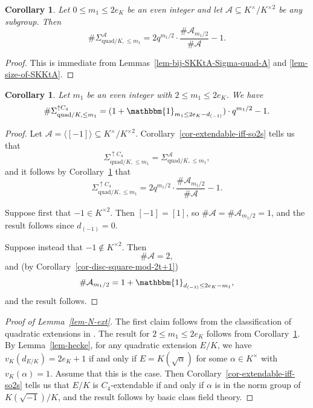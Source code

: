 \documentclass[11pt]{amsart}
\theoremstyle{theorem}
\newtheorem{corollary}[theorem]{Corollary}
\theoremstyle{example}
\theoremstyle{definition}
\numberwithin{theorem}{section}
\numberwithin{theorem}{section}
\newcommand{\quadr}{\mathrm{quad}}
\newcommand{\extendable}{\uparrow C_4}
\begin{document}
\begin{corollary}
    \label{cor-size-of-Sigma-quad-A-leq-m1}
    Let $0 \leq m_1 \leq 2e_K$ be an even integer and let $\mathcal{A}\subseteq K^\times / K^{\times 2}$ be any subgroup. Then
    $$
    \# \Sigma_{\quadr/K,\leq m_1}^{\mathcal{A}} = 2q^{m_1/2} \cdot \frac{\#\mathcal{A}_{m_1/2}}{\#\mathcal{A}} - 1. 
    $$
\end{corollary}
\begin{proof}
    This is immediate from Lemmas~\ref{lem-bij-SKKtA-Sigma-quad-A} and \ref{lem-size-of-SKKtA}. 
\end{proof}
\begin{corollary}
    \label{cor-num-extendables-with-even-disc}
    Let $m_1$ be an even integer with $2 \leq m_1 \leq 2e_K$. We have  
    $$
    \#\Sigma_{\quadr/K,\leq m_1}^{\extendable} =(1 + \mathbbm{1}_{m_1 \leq 2e_K - d_{(-1)}})\cdot q^{m_1/2} - 1. 
    $$
\end{corollary}
\begin{proof}
    Let $\mathcal{A} = \langle [-1] \rangle \subseteq K^\times / K^{\times 2}$. Corollary~\ref{cor-extendable-iff-so2s} tells us that
    $$
    \Sigma_{\quadr/K,\leq m_1}^{\extendable} = \Sigma_{\quadr/K,\leq m_1}^{\mathcal{A}}, 
    $$
    and it follows by Corollary~\ref{cor-size-of-Sigma-quad-A-leq-m1} that 
    $$
    \Sigma_{\quadr/K,\leq m_1}^{\extendable} = 2q^{m_1/2} \cdot \frac{\#\mathcal{A}_{m_1/2}}{\#\mathcal{A}} - 1. 
    $$
    
    Suppose first that $-1 \in K^{\times 2}$. Then $[-1] = [1]$, so $\# \mathcal{A} = \#\mathcal{A}_{m_1/2} = 1$, and the result follows since $d_{(-1)} = 0$. 

    Suppose instead that $-1 \not \in K^{\times 2}$. Then
    $$
    \#\mathcal{A} = 2,
    $$
    and (by Corollary~\ref{cor-disc-square-mod-2t+1})
    $$
    \#\mathcal{A}_{m_1/2} = 1 + \mathbbm{1}_{d_{(-1)} \leq 2e_K - m_1},
    $$
    and the result follows. 
\end{proof}
\begin{proof}[Proof of Lemma~\ref{lem-N-ext}]
    The first claim follows from the classification of quadratic extensions in \cite[Lemma 4.3]{tunnell}.
    The result for $2 \leq m_1 \leq 2e_K$ follows from Corollary~\ref{cor-num-extendables-with-even-disc}. By Lemma~\ref{lem-hecke}, for any quadratic extension $E/K$, we have $v_K(d_{E/K}) = 2e_K + 1$ if and only if $E = K(\sqrt{\alpha})$ for some $\alpha \in K^\times$ with $v_K(\alpha) = 1$. Assume that this is the case. Then Corollary~\ref{cor-extendable-iff-so2s} tells us that $E/K$ is $C_4$-extendable if and only if $\alpha$ is in the norm group of $K(\sqrt{-1})/K$, and the result follows by basic class field theory. 

\end{proof}
\end{document}
